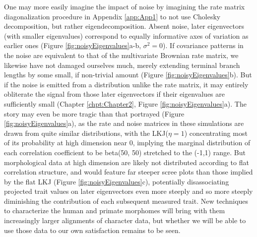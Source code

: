 One may more easily imagine the impact of noise by imagining the rate matrix diagonalization procedure in Appendix \ref{app:App1} to not use Cholesky decomposition, but rather eigendecomposition. Absent noise, later eigenvectors (with smaller eigenvalues) correspond to equally informative axes of variation as earlier ones (Figure \ref{fig:noisyEigenvalues}a-b, $\sigma^2 = 0$). If covariance patterns in the noise are equivalent to that of the multivariate Brownian rate matrix, we likewise have not damaged ourselves much, merely extending terminal branch lengths by some small, if non-trivial amount (Figure \ref{fig:noisyEigenvalues}b). But if the noise is emitted from a distribution unlike the rate matrix, it may entirely obliterate the signal from those later eigenvectors if their eigenvalues are sufficiently small (Chapter \ref{chpt:Chapter2}, Figure \ref{fig:noisyEigenvalues}a). The story may even be more tragic than that portrayed (Figure \ref{fig:noisyEigenvalues}a), as the rate and noise matrices in these simulations are drawn from quite similar distributions, with the LKJ($\eta = 1$) concentrating most of its probability at high dimension near 0, implying the marginal distribution of each correlation coefficient to be beta(50, 50) stretched to the (-1,1) range. But morphological data at high dimension are likely not distributed according to flat correlation structure, and would feature far steeper scree plots than those implied by the flat LKJ (Figure \ref{fig:noisyEigenvalues}c), potentially disassociating projected trait values on later eigenvectors even more steeply and so more steeply diminishing the contribution of each subsequent measured trait. New techniques to characterize the human and primate morphomes will bring with them increasingly larger alignments of character data, but whether we will be able to use those data to our own satisfaction remains to be seen.

